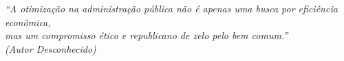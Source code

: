 \begin{epigrafe}
    \vspace*{\fill}
	\begin{flushright}
		\textit{``A otimização na administração pública não é apenas uma busca por eficiência econômica,\\mas um compromisso ético e republicano de zelo pelo bem comum.''\\(Autor Desconhecido)}
	\end{flushright}
\end{epigrafe}
